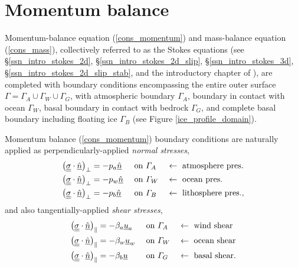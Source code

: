 
\chapter{Momentum balance} \label{ssn_momentum_balance}

Momentum-balance equation (\ref{cons_momentum}) and mass-balance equation (\ref{cons_mass}), collectively referred to as the Stokes equations (see \S \ref{ssn_intro_stokes_2d}, \S \ref{ssn_intro_stokes_2d_slip}, \S \ref{ssn_intro_stokes_3d}, \S \ref{ssn_intro_stokes_2d_slip_stab}, and the introductory chapter of \citet{elman_2005}), are completed with boundary conditions encompassing the entire outer surface $\Gamma = \Gamma_A \cup \Gamma_W \cup \Gamma_G$, with atmospheric boundary $\Gamma_A$, boundary in contact with ocean $\Gamma_W$, basal boundary in contact with bedrock $\Gamma_G$, and complete basal boundary including floating ice $\Gamma_B$ (see Figure \ref{ice_profile_domain}).

Momentum balance (\ref{cons_momentum}) boundary conditions are naturally applied as perpendicularly-applied \emph{normal stresses},
\begin{align}
  \label{atmosphere_normal_stress}
  \big( \underline{\underline{\sigma}} \cdot \underline{\hat{n}} \big)_{\perp} &= - p_a \underline{\hat{n}} &&\text{ on } \varGamma_A &&\leftarrow \text{ atmosphere pres.} \\
  \label{water_normal_stress}
  \big( \underline{\underline{\sigma}} \cdot \underline{\hat{n}} \big)_{\perp} &= - p_w \underline{\hat{n}} &&\text{ on } \varGamma_W &&\leftarrow \text{ ocean pres.} \\
  \label{bedrock_normal_stress}
  \big( \underline{\underline{\sigma}} \cdot \underline{\hat{n}} \big)_{\perp} &= - p_b \underline{\hat{n}} &&\text{ on } \varGamma_B &&\leftarrow \text{ lithosphere pres.},
\end{align}
and also tangentially-applied \emph{shear stresses},
\begin{align}
  \label{atmosphere_shear_stress}
  \big( \underline{\underline{\sigma}} \cdot \underline{\hat{n}} \big)_{\Vert} &= - \beta_a \underline{u}_a &&\text{ on } \varGamma_A &&\leftarrow \text{ wind shear} \\
  \label{water_shear_stress}
  \big( \underline{\underline{\sigma}} \cdot \underline{\hat{n}} \big)_{\Vert} &= - \beta_w \underline{u}_w &&\text{ on } \varGamma_W &&\leftarrow \text{ ocean shear} \\
  \label{bedrock_shear_stress}
  \big( \underline{\underline{\sigma}} \cdot \underline{\hat{n}} \big)_{\Vert} &= - \beta_b \underline{u}   &&\text{ on } \varGamma_G &&\leftarrow \text{ basal shear}.
\end{align}

